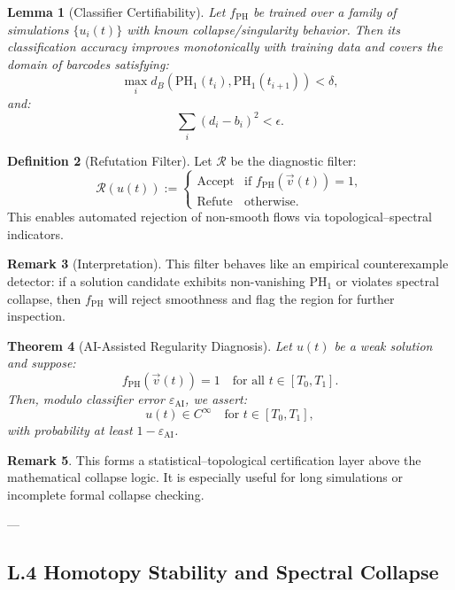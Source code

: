 \documentclass[11pt]{article}
\newtheorem{theorem}{Theorem}[section]
\newtheorem{lemma}[theorem]{Lemma}
\theoremstyle{definition}
\newtheorem{definition}[theorem]{Definition}
\newtheorem{remark}[theorem]{Remark}
\begin{document}
\begin{lemma}[Classifier Certifiability]
Let $f_{\mathrm{PH}}$ be trained over a family of simulations $\{ u_i(t) \}$ with known collapse/singularity behavior.  
Then its classification accuracy improves monotonically with training data and covers the domain of barcodes satisfying:
\[
\max_i d_B(\mathrm{PH}_1(t_i), \mathrm{PH}_1(t_{i+1})) < \delta,
\]
and:
\[
\sum_i (d_i - b_i)^2 < \epsilon.
\]
\end{lemma}

\begin{definition}[Refutation Filter]
Let $\mathcal{R}$ be the diagnostic filter:
\[
\mathcal{R}(u(t)) := 
\begin{cases}
\text{Accept} & \text{if } f_{\mathrm{PH}}(\vec{v}(t)) = 1, \\
\text{Refute} & \text{otherwise}.
\end{cases}
\]
This enables automated rejection of non-smooth flows via topological–spectral indicators.
\end{definition}

\begin{remark}[Interpretation]
This filter behaves like an empirical counterexample detector:  
if a solution candidate exhibits non-vanishing $\mathrm{PH}_1$ or violates spectral collapse,  
then $f_{\mathrm{PH}}$ will reject smoothness and flag the region for further inspection.
\end{remark}

\begin{theorem}[AI-Assisted Regularity Diagnosis]
Let $u(t)$ be a weak solution and suppose:
\[
f_{\mathrm{PH}}(\vec{v}(t)) = 1 \quad \text{for all } t \in [T_0, T_1].
\]
Then, modulo classifier error $\varepsilon_\mathrm{AI}$, we assert:
\[
u(t) \in C^\infty \quad \text{for } t \in [T_0, T_1],
\]
with probability at least $1 - \varepsilon_\mathrm{AI}$.
\end{theorem}

\begin{remark}
This forms a statistical–topological certification layer above the mathematical collapse logic.  
It is especially useful for long simulations or incomplete formal collapse checking.
\end{remark}

---

\subsection*{L.4 Homotopy Stability and Spectral Collapse}
\end{document}
